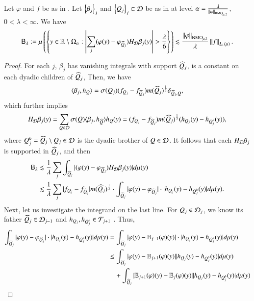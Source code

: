 \documentclass[leqno]{amsart}
\begin{document}
\begin{lemma}\label{estimate to T41}
Let $\varphi$ and $f$ be as in . Let $\left\{ \beta_{j} \right\}_{j}$ and $\left\{ Q_{j} \right\}_{j}\subset{\mathcal D}$ be as  in  at level $\alpha=\frac{\lambda}{\left\| \varphi \right\|_{{\rm BMO}_{\mu,2}}}$,  $0<\lambda<\infty$. We have
\begin{align*}
\mathsf{B}_{\lambda}:=\mu\left(\set{y\in\RR\setminus\Omega_{\alpha}:
\left|\sum_{j}(\varphi(y)-\varphi_{\wh{Q}_{j}})H_{\D}\beta_{j}(y)\right|>\frac{\lambda}{6}}\right)
\lesssim\frac{\Norm{\varphi}_{\BMO_{\mu,2}}}{\lambda}\Norm{f}_{L_{1}(\mu)}.
\end{align*}
\end{lemma}
\begin{proof}
For each $j$, $\beta_{j}$ has vanishing integrals with support $\widehat{Q}_{j}$, is a constant on each dyadic children of $\widehat{Q}_{j}$, Then, we have
$$\langle \beta_{j},h_{Q} \rangle=
\sigma(Q_{j})(f_{Q_{j}}-f_{\widehat{Q}_{j}})m(\widehat{Q}_{j})^{\frac{1}{2}}\delta_{\widehat{Q}_{j},Q},$$
which further implies
$$H_{{\mathcal D}}\beta_{j}(y)=\sum_{Q\in{\mathcal D}}\sigma(Q)\langle \beta_{j},h_{\widehat{Q}} \rangle h_{Q}(y)
=(f_{Q_{j}}-f_{\widehat{Q}_{j}})m(\widehat{Q}_{j})^{\frac{1}{2}}(h_{Q_{j}}(y)-h_{Q_{j}^{b}}(y)),$$
where $Q_{j}^{b}=\widehat{Q}_{j}\setminus Q_{j}\in{\mathcal D}$ is the dyadic brother of $Q\in{\mathcal D}$. 
It follows that each $H_{{\mathcal D}}\beta_{j}$ is supported in $\widehat{Q}_{j}$, and then
\begin{equation}\label{estimate T41}
\begin{split}
\mathsf{B}_{\lambda}
&\lesssim\frac{1}{\lambda}
\sum_{j}\int_{\widehat{Q}_{j}}|(\varphi(y)-\varphi_{\widehat{Q}_{j}})H_{{\mathcal D}}\beta_{j}(y)|d\mu(y)\\
&\lesssim
\frac{1}{\lambda}\sum_{j}|f_{Q_{j}}-f_{\widehat{Q}_{j}}|m(\widehat{Q}_{j})^{\frac{1}{2}}\cdot
\int_{\widehat{Q}_{j}}|\varphi(y)-\varphi_{\widehat{Q}_{j}}|\cdot|h_{Q_{j}}(y)-h_{Q_{j}^{b}}(y)|d\mu(y).
\end{split}
\end{equation}
Next, let us investigate the integrand on the last line. For $Q_{j}\in{\mathcal D}_{j}$, we know its father $\widehat{Q}_{j}\in{\mathcal D}_{j-1}$ and  $h_{Q_{j}},h_{Q_{j}^{b}}\in{\mathcal F}_{j+1}$ . Thus,
\begin{align*}
\int_{\wh{Q}_{j}}|\varphi(y)-\varphi_{\wh{Q}_{j}}|\cdot|h_{Q_{j}}(y)-h_{Q_{j}^{b}}(y)|d\mu(y)
&=\int_{\wh{Q}_{j}}|\varphi(y)-\EE_{j-1}(\varphi)(y)|\cdot|h_{Q_{j}}(y)-h_{Q_{j}^{b}}(y)|d\mu(y)\\
&\leq\int_{\wh{Q}_{j}}|\varphi(y)-\EE_{j+1}(\varphi)(y)||h_{Q_{j}}(y)-h_{Q_{j}^{b}}(y)|d\mu(y)\\
&\quad+\int_{\wh{Q}_{j}}|\EE_{j+1}(\varphi)(y)-\EE_{j}(\varphi)(y)||h_{Q_{j}}(y)-h_{Q_{j}^{b}}(y)|d\mu(y)\\

\end{align*}
\end{proof}
\end{document}
